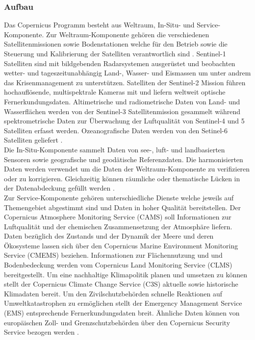 \subsubsection{Aufbau}
Das Copernicus Programm besteht aus Weltraum, In-Situ- und Service-Komponente. 
Zur Weltraum-Komponente gehören die verschiedenen Satellitenmissionen sowie Bodenstationen welche für den Betrieb sowie die Steuerung und Kalibrierung  der 
Satelliten verantwortlich sind \cite{copernicus_regulation}. Sentinel-1 Satelliten sind mit bildgebenden Radarsystemen ausgerüstet und beobachten wetter- und 
tageszeitunabhängig Land-, Wasser- und Eismassen um unter andrem das Krisenmanagement zu unterstützen. Satelliten der Sentinel-2 Mission führen hochauflösende, 
multispektrale Kameras mit und liefern weltweit optische Fernerkundungsdaten. Altimetrische und radiometrische Daten von Land- und Wasserflächen werden von der 
Sentinel-3 Satellitenmission gesammelt während spektrometrische Daten zur Überwachung der Luftqualität von Sentinel-4 und 5 Satelliten erfasst werden. 
Ozeanografische Daten werden von den Setinel-6 Satelliten geliefert \cite{sentinel_overview}. \\

Die In-Situ-Komponente sammelt Daten von see-, luft- und landbasierten Sensoren sowie geografische und geodätische Referenzdaten. Die harmonisierten Daten 
werden verwendet um die Daten der Weltraum-Komponente zu verifizieren oder zu korrigieren. Gleichzeitig können räumliche oder thematische Lücken in der 
Datenabdeckung gefüllt werden \cite{copernicus_regulation}\cite{what_is_copernicus}. \\

Zur Service-Komponente gehören unterschiedliche Dienste welche jeweils auf Themengebiet abgestimmt sind und Daten in hoher Qualität bereitstellen.
Der Copernicus Atmosphere Monitoring Service (CAMS) soll Informationen zur Luftqualität und der chemischen Zusammensetzung der Atmosphäre liefern. 
Daten bezüglich des Zustands und der Dynamik der Meere und deren Ökosysteme lassen sich über den Copernicus Marine Environment Monitoring Service (CMEMS) beziehen. 
Informationen zur Flächennutzung und und Bodenbedeckung werden vom Copernicus Land Monitoring Service (CLMS) bereitgestellt. 
Um eine nachhaltige Klimapolitik planen und umsetzen zu können stellt der Copernicus Climate Change Service (C3S) aktuelle sowie historische Klimadaten bereit.  
Um den Zivilschutzbehörden schnelle Reaktionen auf Umweltkatastrophen zu ermöglichen stellt der  Emergency Management Service (EMS) entsprechende Fernerkundungsdaten 
breit. Ähnliche Daten können von europäischen Zoll- und Grenzschutzbehörden über den Copernicus Security Service bezogen werden
\cite{copernicus_regulation}\cite{what_is_copernicus}.


